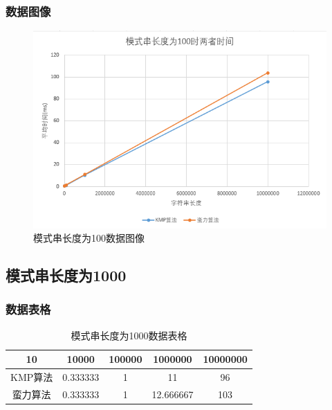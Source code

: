 \documentclass[UTF8]{ctexart}
\begin{document}
\subsubsection{数据图像}
\begin{figure}[h]
    \centering
    \includegraphics[scale=0.6]{100.png}
    \caption{模式串长度为100数据图像}
\end{figure}
\clearpage
\subsection{模式串长度为1000}
\subsubsection{数据表格}
\begin{table}[h]
    \centering
    \begin{tabular}{|c|c|c|c|c|}
        \hline
        10&	10000&	100000&	1000000&	10000000\\
        \hline
        KMP算法&	0.333333&	1&	11&	    96\\
        \hline
        蛮力算法&	0.333333&	1&	12.666667&	103\\
        \hline
    \end{tabular}
    \caption{模式串长度为1000数据表格}
\end{table}
\end{document}
